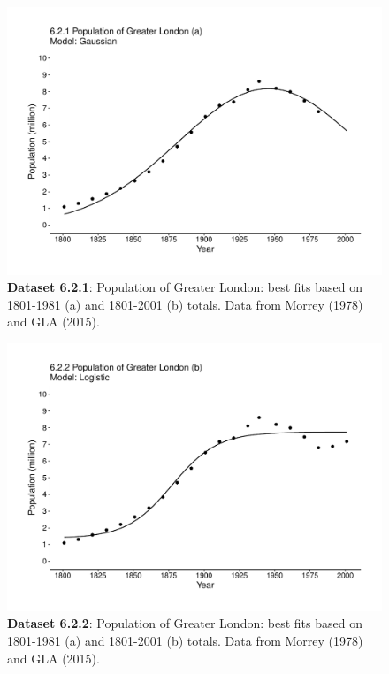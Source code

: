 \documentclass[aps,rmp,preprint,superscriptaddress,10pt,onecolumn]{article}
\begin{document}
\clearpage
\begin{figure}[h]
\includegraphics[width=\textwidth]{output/figs-ggplot/6.2.1.pdf}
\caption{\textbf{Dataset 6.2.1}: Population of Greater London: best fits based on 1801-1981 (a) and 1801-2001 (b) totals. Data from Morrey (1978) and GLA (2015). }
\end{figure}
	
\clearpage
\begin{figure}[h]
\includegraphics[width=\textwidth]{output/figs-ggplot/6.2.2.pdf}
\caption{\textbf{Dataset 6.2.2}: Population of Greater London: best fits based on 1801-1981 (a) and 1801-2001 (b) totals. Data from Morrey (1978) and GLA (2015). }
\end{figure}
	
\end{document}
